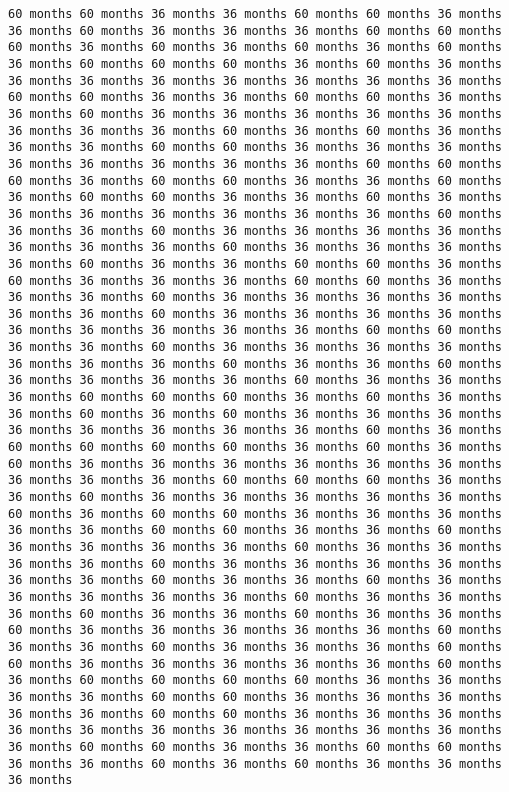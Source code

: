 \documentclass[11pt]{article}
\begin{document}
\begin{Verbatim}[commandchars=\\\{\}, frame=single, framerule=2mm, rulecolor=\color{outerrorbackground}]
60 months 60 months 36 months 36 months 60 months 60 months 36 months 36 months 60 months 36 months 36 months 36 months 60 months 60 months 60 months 36 months 60 months 36 months 60 months 36 months 60 months 36 months 60 months 60 months 60 months 36 months 60 months 36 months 36 months 36 months 36 months 36 months 36 months 36 months 36 months 60 months 60 months 36 months 36 months 60 months 60 months 36 months 36 months 60 months 36 months 36 months 36 months 36 months 36 months 36 months 36 months 36 months 60 months 36 months 60 months 36 months 36 months 36 months 60 months 60 months 36 months 36 months 36 months 36 months 36 months 36 months 36 months 36 months 60 months 60 months 60 months 36 months 60 months 60 months 36 months 36 months 60 months 36 months 60 months 60 months 36 months 36 months 60 months 36 months 36 months 36 months 36 months 36 months 36 months 36 months 60 months 36 months 36 months 60 months 36 months 36 months 36 months 36 months 36 months 36 months 36 months 60 months 36 months 36 months 36 months 36 months 60 months 36 months 36 months 60 months 60 months 36 months 60 months 36 months 36 months 36 months 60 months 60 months 36 months 36 months 36 months 60 months 36 months 36 months 36 months 36 months 36 months 36 months 60 months 36 months 36 months 36 months 36 months 36 months 36 months 36 months 36 months 36 months 60 months 60 months 36 months 36 months 60 months 36 months 36 months 36 months 36 months 36 months 36 months 36 months 60 months 36 months 36 months 60 months 36 months 36 months 36 months 36 months 60 months 36 months 36 months 36 months 60 months 60 months 60 months 36 months 60 months 36 months 36 months 60 months 36 months 60 months 36 months 36 months 36 months 36 months 36 months 36 months 36 months 36 months 60 months 36 months 60 months 60 months 60 months 60 months 36 months 60 months 36 months 60 months 36 months 36 months 36 months 36 months 36 months 36 months 36 months 36 months 36 months 60 months 60 months 60 months 36 months 36 months 60 months 36 months 36 months 36 months 36 months 36 months 60 months 36 months 60 months 60 months 36 months 36 months 36 months 36 months 36 months 60 months 60 months 36 months 36 months 60 months 36 months 36 months 36 months 36 months 60 months 36 months 36 months 36 months 36 months 60 months 36 months 36 months 36 months 36 months 36 months 36 months 60 months 36 months 36 months 60 months 36 months 36 months 36 months 36 months 36 months 60 months 36 months 36 months 36 months 60 months 36 months 36 months 60 months 36 months 36 months 60 months 36 months 36 months 36 months 36 months 36 months 60 months 36 months 36 months 60 months 36 months 36 months 36 months 60 months 60 months 36 months 36 months 36 months 36 months 36 months 60 months 36 months 60 months 60 months 60 months 60 months 36 months 36 months 36 months 36 months 60 months 60 months 36 months 36 months 36 months 36 months 36 months 60 months 60 months 36 months 36 months 36 months 36 months 36 months 36 months 36 months 36 months 36 months 36 months 36 months 60 months 60 months 36 months 36 months 60 months 60 months 36 months 36 months 60 months 36 months 60 months 36 months 36 months 36 months 
\end{Verbatim}
\end{document}
